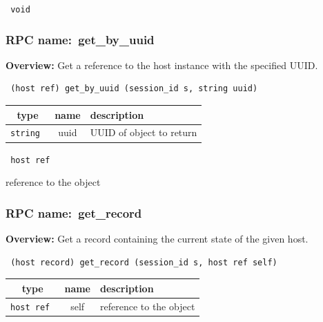 \vspace{0.3cm}

{\tt 
void
}



\vspace{0.3cm}
\vspace{0.3cm}
\vspace{0.3cm}
\subsubsection{RPC name:~get\_by\_uuid}

{\bf Overview:} 
Get a reference to the host instance with the specified UUID.

\begin{verbatim} (host ref) get_by_uuid (session_id s, string uuid)\end{verbatim}



 
\vspace{0.3cm}
\begin{tabular}{|c|c|p{7cm}|}
 \hline
{\bf type} & {\bf name} & {\bf description} \\ \hline
{\tt string } & uuid & UUID of object to return \\ \hline 

\end{tabular}

\vspace{0.3cm}

{\tt 
host ref
}


reference to the object
\vspace{0.3cm}
\vspace{0.3cm}
\vspace{0.3cm}
\subsubsection{RPC name:~get\_record}

{\bf Overview:} 
Get a record containing the current state of the given host.

\begin{verbatim} (host record) get_record (session_id s, host ref self)\end{verbatim}



 
\vspace{0.3cm}
\begin{tabular}{|c|c|p{7cm}|}
 \hline
{\bf type} & {\bf name} & {\bf description} \\ \hline
{\tt host ref } & self & reference to the object \\ \hline 

\end{tabular}

